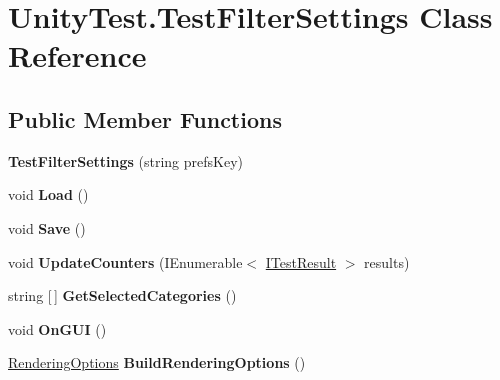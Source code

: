 \hypertarget{class_unity_test_1_1_test_filter_settings}{}\section{Unity\+Test.\+Test\+Filter\+Settings Class Reference}
\label{class_unity_test_1_1_test_filter_settings}
\subsection*{Public Member Functions}
\begin{DoxyCompactItemize}
\item 
\mbox{\label{class_unity_test_1_1_test_filter_settings_a5fd85365bc86d6407b9142b2dd38d309}} 
{\bfseries Test\+Filter\+Settings} (string prefs\+Key)
\item 
\mbox{\label{class_unity_test_1_1_test_filter_settings_a4f7a3fdc5a11e5b0f6cab35dee299f04}} 
void {\bfseries Load} ()
\item 
\mbox{\label{class_unity_test_1_1_test_filter_settings_a90acde506f80b49e9f04daf19a57070e}} 
void {\bfseries Save} ()
\item 
\mbox{\label{class_unity_test_1_1_test_filter_settings_adf3dd8e5874dc82501c4d2dc980b92c8}} 
void {\bfseries Update\+Counters} (I\+Enumerable$<$ \hyperlink{interface_i_test_result}{I\+Test\+Result} $>$ results)
\item 
\mbox{\label{class_unity_test_1_1_test_filter_settings_a3adffbb36e41a549b9b82e44a494e86a}} 
string \mbox{[}$\,$\mbox{]} {\bfseries Get\+Selected\+Categories} ()
\item 
\mbox{\label{class_unity_test_1_1_test_filter_settings_a9928ff33e6a7cb689a76feeaf7cf64a2}} 
void {\bfseries On\+G\+UI} ()
\item 
\mbox{\label{class_unity_test_1_1_test_filter_settings_af28152631b6ce9252a12b588de050b3f}} 
\hyperlink{class_unity_test_1_1_rendering_options}{Rendering\+Options} {\bfseries Build\+Rendering\+Options} ()
\end{DoxyCompactItemize}
